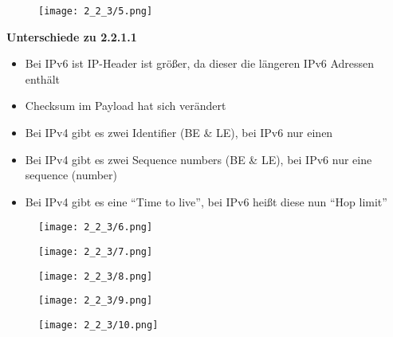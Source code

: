         \begin{figure}[H]
        \centering
        \texttt{[image: 2\_2\_3/5.png]}
        \end{figure}

        \textbf{Unterschiede zu 2.2.1.1}
        \begin{itemize}
            \item Bei IPv6 ist IP-Header ist größer, da dieser die längeren IPv6 Adressen enthält
            \item Checksum im Payload hat sich verändert
            \item Bei IPv4 gibt es zwei Identifier (BE \& LE), bei IPv6 nur einen
            \item Bei IPv4 gibt es zwei Sequence numbers (BE \& LE), bei IPv6 nur eine sequence (number)
            \item Bei IPv4 gibt es eine “Time to live”, bei IPv6 heißt diese nun “Hop limit”
        \end{itemize}

        
        \begin{figure}[H]
        \centering
        \texttt{[image: 2\_2\_3/6.png]}
        \end{figure}

        \begin{figure}[H]
        \centering
        \texttt{[image: 2\_2\_3/7.png]}
        \end{figure}

        \begin{figure}[H]
        \centering
        \texttt{[image: 2\_2\_3/8.png]}
        \end{figure}

        \begin{figure}[H]
        \centering
        \texttt{[image: 2\_2\_3/9.png]}
        \end{figure}

        \begin{figure}[H]
        \centering
        \texttt{[image: 2\_2\_3/10.png]}
        \end{figure}

